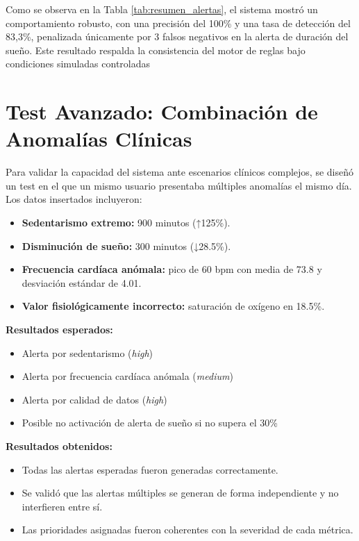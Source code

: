 Como se observa en la Tabla \ref{tab:resumen_alertas}, el sistema mostró un comportamiento robusto, con una precisión del 100\% y una tasa de detección del 83,3\%, penalizada únicamente por 3 falsos negativos en la alerta de duración del sueño. Este resultado respalda la consistencia del motor de reglas bajo condiciones simuladas controladas

\section{Test Avanzado: Combinación de Anomalías Clínicas}
\label{sec:test_combinadas}

Para validar la capacidad del sistema ante escenarios clínicos complejos, se diseñó un test en el que un mismo usuario presentaba múltiples anomalías el mismo día. Los datos insertados incluyeron:

\begin{itemize}
    \item \textbf{Sedentarismo extremo:} 900 minutos (↑125\%).
    \item \textbf{Disminución de sueño:} 300 minutos (↓28.5\%).
    \item \textbf{Frecuencia cardíaca anómala:} pico de 60 bpm con media de 73.8 y desviación estándar de 4.01.
    \item \textbf{Valor fisiológicamente incorrecto:} saturación de oxígeno en 18.5\%.
\end{itemize}

\noindent\textbf{Resultados esperados:}
\begin{itemize}
    \item Alerta por sedentarismo (\textit{high})
    \item Alerta por frecuencia cardíaca anómala (\textit{medium})
    \item Alerta por calidad de datos (\textit{high})
    \item Posible no activación de alerta de sueño si no supera el 30\%
\end{itemize}

\noindent\textbf{Resultados obtenidos:}
\begin{itemize}
    \item Todas las alertas esperadas fueron generadas correctamente.
    \item Se validó que las alertas múltiples se generan de forma independiente y no interfieren entre sí.
    \item Las prioridades asignadas fueron coherentes con la severidad de cada métrica.
\end{itemize}

